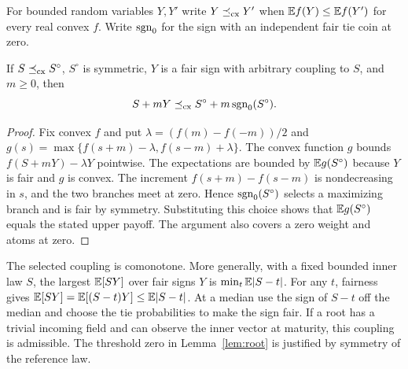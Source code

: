 For bounded random variables $Y,Y'$ write $Y\preceq_{\rm cx} Y'$ when
$\mathbb E f(Y)\le \mathbb E f(Y')$ for every real convex $f$. Write $\operatorname{sgn}_0$ for
the sign with an independent fair tie coin at zero.

\begin{lemma}\label{lem:root}
If $S\preceq_{\rm cx} S^\circ$, $S^\circ$ is symmetric, $Y$ is a fair sign with
arbitrary coupling to $S$, and $m\ge0$, then
\[
 S+mY\preceq_{\rm cx} S^\circ+m\operatorname{sgn}_0(S^\circ).
\]
\end{lemma}
\begin{proof}
Fix convex $f$ and put $\lambda=(f(m)-f(-m))/2$ and
$g(s)=\max\{f(s+m)-\lambda,f(s-m)+\lambda\}$.
The convex function $g$ bounds $f(S+mY)-\lambda Y$ pointwise.
The expectations are bounded by $\mathbb E g(S^\circ)$ because $Y$ is fair
and $g$ is convex. The increment $f(s+m)-f(s-m)$ is nondecreasing
in $s$, and the two branches meet at zero. Hence $\operatorname{sgn}_0(S^\circ)$
selects a maximizing branch and is fair by symmetry. Substituting
this choice shows that $\mathbb E g(S^\circ)$ equals the stated upper payoff.
The argument also covers a zero weight and atoms at zero.
\end{proof}

The selected coupling is comonotone. More generally, with a fixed
bounded inner law $S$, the largest $\mathbb E[SY]$ over fair signs $Y$ is
$\min_t\mathbb E|S-t|$. For any $t$, fairness gives
$\mathbb E[SY]=\mathbb E[(S-t)Y]\le \mathbb E|S-t|$. At a median use the sign of $S-t$
off the median and choose the tie probabilities to make the sign fair.
If a root has a trivial incoming field and can observe the inner vector
at maturity, this coupling is admissible. The threshold zero in
Lemma~\ref{lem:root} is justified by symmetry of the reference law.

